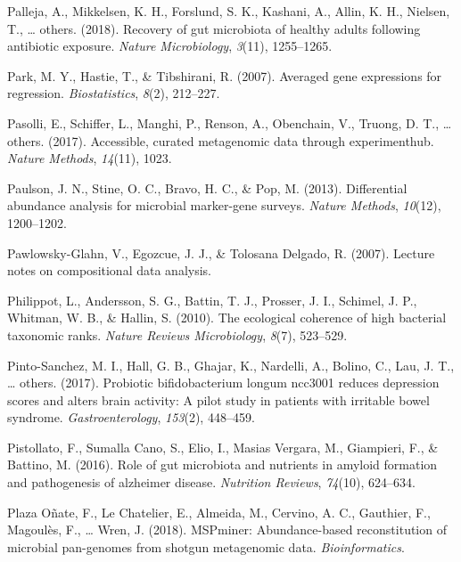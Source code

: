 \documentclass[12pt,a4paper]{reedthesis}
\theoremstyle{definition}
\theoremstyle{definition}
\theoremstyle{definition}
\theoremstyle{remark}
\begin{document}
\leavevmode\hypertarget{ref-palleja2018recovery}{}%
Palleja, A., Mikkelsen, K. H., Forslund, S. K., Kashani, A., Allin, K. H., Nielsen, T., \ldots{} others. (2018). Recovery of gut microbiota of healthy adults following antibiotic exposure. \emph{Nature Microbiology}, \emph{3}(11), 1255--1265.

\leavevmode\hypertarget{ref-park2007averaged}{}%
Park, M. Y., Hastie, T., \& Tibshirani, R. (2007). Averaged gene expressions for regression. \emph{Biostatistics}, \emph{8}(2), 212--227.

\leavevmode\hypertarget{ref-pasolli2017accessible}{}%
Pasolli, E., Schiffer, L., Manghi, P., Renson, A., Obenchain, V., Truong, D. T., \ldots{} others. (2017). Accessible, curated metagenomic data through experimenthub. \emph{Nature Methods}, \emph{14}(11), 1023.

\leavevmode\hypertarget{ref-paulson2013differential}{}%
Paulson, J. N., Stine, O. C., Bravo, H. C., \& Pop, M. (2013). Differential abundance analysis for microbial marker-gene surveys. \emph{Nature Methods}, \emph{10}(12), 1200--1202.

\leavevmode\hypertarget{ref-pawlowsky2007lecture}{}%
Pawlowsky-Glahn, V., Egozcue, J. J., \& Tolosana Delgado, R. (2007). Lecture notes on compositional data analysis.

\leavevmode\hypertarget{ref-philippot2010ecological}{}%
Philippot, L., Andersson, S. G., Battin, T. J., Prosser, J. I., Schimel, J. P., Whitman, W. B., \& Hallin, S. (2010). The ecological coherence of high bacterial taxonomic ranks. \emph{Nature Reviews Microbiology}, \emph{8}(7), 523--529.

\leavevmode\hypertarget{ref-pinto2017probiotic}{}%
Pinto-Sanchez, M. I., Hall, G. B., Ghajar, K., Nardelli, A., Bolino, C., Lau, J. T., \ldots{} others. (2017). Probiotic bifidobacterium longum ncc3001 reduces depression scores and alters brain activity: A pilot study in patients with irritable bowel syndrome. \emph{Gastroenterology}, \emph{153}(2), 448--459.

\leavevmode\hypertarget{ref-pistollato2016role}{}%
Pistollato, F., Sumalla Cano, S., Elio, I., Masias Vergara, M., Giampieri, F., \& Battino, M. (2016). Role of gut microbiota and nutrients in amyloid formation and pathogenesis of alzheimer disease. \emph{Nutrition Reviews}, \emph{74}(10), 624--634.

\leavevmode\hypertarget{ref-plaza2018mspminer}{}%
Plaza Oñate, F., Le Chatelier, E., Almeida, M., Cervino, A. C., Gauthier, F., Magoulès, F., \ldots{} Wren, J. (2018). MSPminer: Abundance-based reconstitution of microbial pan-genomes from shotgun metagenomic data. \emph{Bioinformatics}.
\end{document}
